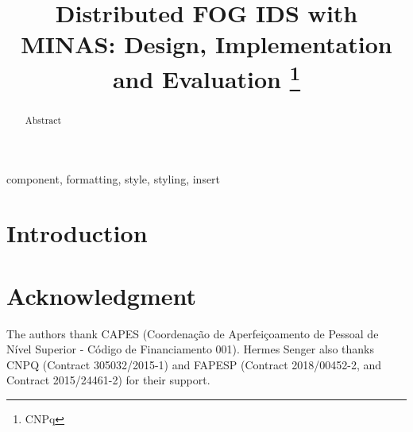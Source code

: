 \documentclass[conference]{lib/IEEEtran}
\begin{document}
\title{Distributed FOG IDS with MINAS: Design, Implementation and Evaluation
\thanks{CNPq}
}

\author{
}

\maketitle

\begin{abstract}
  Abstract
\end{abstract}

\begin{IEEEkeywords}
component, formatting, style, styling, insert
\end{IEEEkeywords}

\section{Introduction}

\section*{Acknowledgment}

The authors thank CAPES (Coordenação de Aperfeiçoamento de Pessoal de Nível Superior - Código de Financiamento 001).
Hermes Senger also thanks CNPQ (Contract 305032/2015-1) and FAPESP (Contract 2018/00452-2, and Contract 2015/24461-2) for their support.


\end{document}

